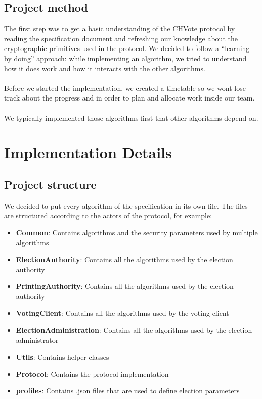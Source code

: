 \documentclass[a4paper,12pt]{report}
\theoremstyle{definition}
\begin{document}
\section{Project method}
The first step was to get a basic understanding of the CHVote protocol by reading the specification document and refreshing our knowledge about the cryptographic primitives used in the protocol. We decided to follow a "`learning by doing"' approach: while implementing an algorithm, we tried to understand how it does work and how it interacts with the other algorithms.
\\\\
\noindent Before we started the implementation, we created a timetable so we wont lose track about the progress and in order to plan and allocate work inside our team.
\\\\\noindent We typically implemented those algorithms first that other algorithms depend on.

\chapter{Implementation Details}
\section{Project structure}
We decided to put every algorithm of the specification in its own file. The files are structured according to the actors of the protocol, for example:
\begin{itemize}
	\item \textbf{Common}: Contains algorithms and the security parameters used by multiple algorithms
	\item \textbf{ElectionAuthority}: Contains all the algorithms used by the election authority
	\item \textbf{PrintingAuthority}: Contains all the algorithms used by the election authority
	\item \textbf{VotingClient}: Contains all the algorithms used by the voting client
	\item \textbf{ElectionAdministration}: Contains all the algorithms used by the election administrator
	\item \textbf{Utils}: Contains helper classes
	\item \textbf{Protocol}: Contains the protocol implementation
	\item \textbf{profiles}: Contains .json files that are used to define election parameters	
\end{itemize}
\end{document}
